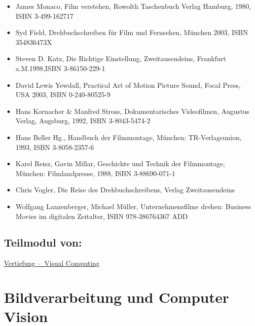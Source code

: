 \begin{itemize}
\tightlist
\item
  James Monaco, Film verstehen, Rowolth Taschenbuch Verlag Hamburg,
  1980, ISBN 3-499-162717
\item
  Syd Field, Drehbuchschreiben für Film und Fernsehen, München 2003,
  ISBN 354836473X
\item
  Steven D. Katz, Die Richtige Einstellung, Zweitausendeins, Frankfurt
  a.M.1998,ISBN 3-86150-229-1
\item
  David Lewis Yewdall, Practical Art of Motion Picture Sound, Focal
  Press, USA 2003, ISBN 0-240-80525-9
\item
  Hans Kornacher \& Manfred Stross, Dokumentarisches Videofilmen,
  Augustus Verlag, Augsburg, 1992, ISBN 3-8043-5474-2
\item
  Hans Beller Hg., Handbuch der Filmmontage, München: TR-Verlagsunion,
  1993, ISBN 3-8058-2357-6
\item
  Karel Reisz, Gavin Millar, Geschichte und Technik der Filmmontage,
  München: Filmlandpresse, 1988, ISBN 3-88690-071-1
\item
  Chris Vogler, Die Reise des Drehbuchschreibens, Verlag Zweitausendeins
\item
  Wolfgang Lanzenberger, Michael Müller, Unternehmensfilme drehen:
  Business Movies im digitalen Zeitalter, ISBN 978-386764367 ADD
\end{itemize}

\hypertarget{teilmodul-vonpathlabelmi-2017modulbeschreibungen-bachelorba_vc-audiovisuelles-medienprojekt-2}{%
\section*{Teilmodul
von:\label{/mi-2017/modulbeschreibungen-bachelor/BA_VC-audiovisuelles-medienprojekt-2}}\label{teilmodul-vonpathlabelmi-2017modulbeschreibungen-bachelorba_vc-audiovisuelles-medienprojekt-2}}

\hyperref[/mi-2017/modulbeschreibungen-bachelor/BA_Vertiefung-Visual-Computing]{Vertiefung – Visual Computing}

\hypertarget{bildverarbeitung-und-computer-visionpathlabelmi-2017modulbeschreibungen-bachelorba_vc-bildverarbeitung-und-computer-vision}{%
\chapter{Bildverarbeitung und Computer
Vision\label{/mi-2017/modulbeschreibungen-bachelor/BA_VC-bildverarbeitung-und-computer-vision}}\label{bildverarbeitung-und-computer-visionpathlabelmi-2017modulbeschreibungen-bachelorba_vc-bildverarbeitung-und-computer-vision}}

